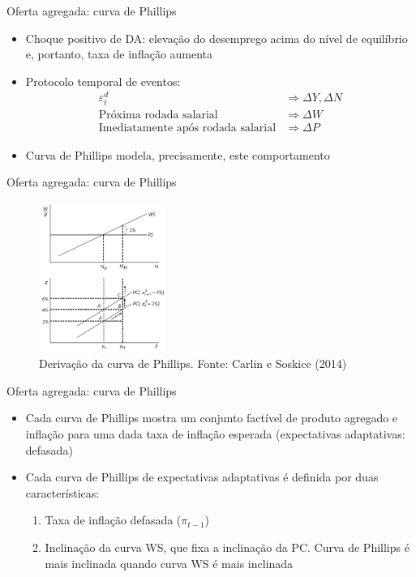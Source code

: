 \documentclass[10pt]{beamer}
\begin{document}
\begin{frame}
    {Oferta agregada: curva de Phillips}
    \begin{itemize}
        \item Choque positivo de DA: elevação do desemprego acima do nível de equilíbrio e, portanto, taxa de inflação aumenta\bigskip
        \item Protocolo temporal de eventos:
        \begin{align*}
            \varepsilon_t^d &\Rightarrow \Delta Y, \Delta N \\
            \text{Próxima rodada salarial} &\Rightarrow \Delta W \\
            \text{Imediatamente após rodada salarial} &\Rightarrow \Delta P
        \end{align*}
        \item Curva de Phillips modela, precisamente, este comportamento
    \end{itemize}
\end{frame}

\begin{frame}
    {Oferta agregada: curva de Phillips}
    \begin{figure}
        \includegraphics[width=0.37\textwidth]{./figures/aula14_fig3.PNG}
        \caption{Derivação da curva de Phillips. Fonte: Carlin e Soskice (2014)}
    \end{figure}
\end{frame}

\begin{frame}
    {Oferta agregada: curva de Phillips}
    \begin{itemize}
        \item Cada curva de Phillips mostra um conjunto factível de produto agregado e inflação para uma dada taxa de inflação esperada (expectativas adaptativas: defasada)\bigskip
        \item Cada curva de Phillips de expectativas adaptativas é definida por duas características:\medskip
        \begin{enumerate}
            \item Taxa de inflação defasada ($\pi_{t-1}$)\medskip
            \item Inclinação da curva WS, que fixa a inclinação da PC. Curva de Phillips é mais inclinada quando curva WS é mais inclinada
        \end{enumerate}
    \end{itemize}
\end{frame}
\end{document}
